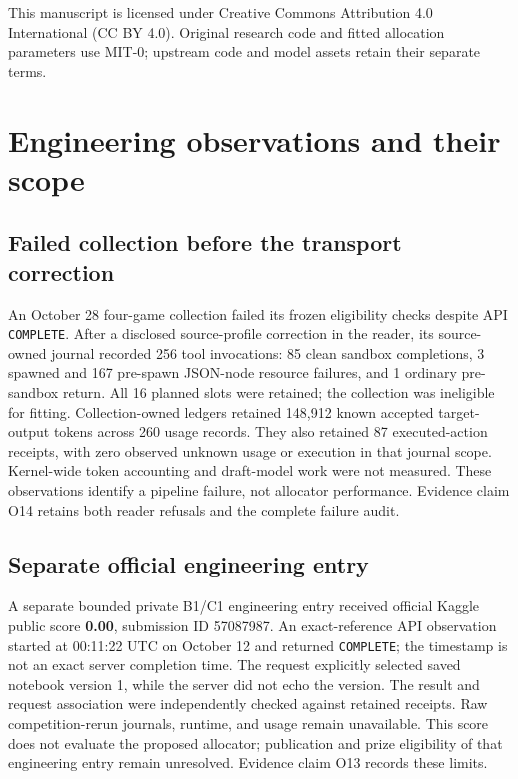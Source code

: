 \documentclass[11pt]{article}
\begin{document}
This manuscript is licensed under Creative Commons Attribution 4.0 International (CC BY 4.0). Original research code and fitted allocation parameters use MIT-0; upstream code and model assets retain their separate terms.

\appendix
\section{Engineering observations and their scope}\label{app:engineering}
\subsection{Failed collection before the transport correction}
An October 28 four-game collection failed its frozen eligibility checks despite API \texttt{COMPLETE}. After a disclosed source-profile correction in the reader, its source-owned journal recorded 256 tool invocations: 85 clean sandbox completions, 3 spawned and 167 pre-spawn JSON-node resource failures, and 1 ordinary pre-sandbox return. All 16 planned slots were retained; the collection was ineligible for fitting. Collection-owned ledgers retained 148,912 known accepted target-output tokens across 260 usage records. They also retained 87 executed-action receipts, with zero observed unknown usage or execution in that journal scope. Kernel-wide token accounting and draft-model work were not measured. These observations identify a pipeline failure, not allocator performance. Evidence claim O14 retains both reader refusals and the complete failure audit.

\subsection{Separate official engineering entry}
A separate bounded private B1/C1 engineering entry received official Kaggle public score \textbf{0.00}, submission ID 57087987. An exact-reference API observation started at 00:11:22 UTC on October 12 and returned \texttt{COMPLETE}; the timestamp is not an exact server completion time. The request explicitly selected saved notebook version 1, while the server did not echo the version. The result and request association were independently checked against retained receipts. Raw competition-rerun journals, runtime, and usage remain unavailable. This score does not evaluate the proposed allocator; publication and prize eligibility of that engineering entry remain unresolved. Evidence claim O13 records these limits.
\end{document}
